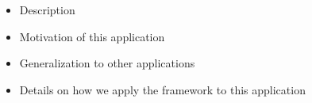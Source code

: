 \begin{itemize}
	\item Description
	\item Motivation of this application
	\item Generalization to other applications
	\item Details on how we apply the framework to this application
\end{itemize}

%
%
%
%
%
%
%
